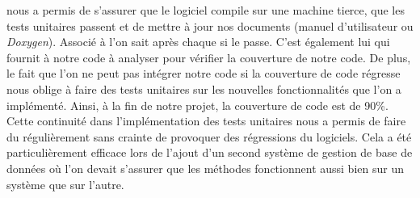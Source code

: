 \Travis{} nous a permis de s'assurer que le logiciel compile sur une machine tierce, que les tests unitaires passent et de mettre à jour nos documents (manuel d'utilisateur ou \textit{Doxygen}). Associé à \Github{} l'on sait après chaque \Commit{} si le \Build{} passe. C'est également lui qui fournit à \Coveralls{} notre code à analyser pour vérifier la couverture de notre code. De plus, le fait que l'on ne peut pas intégrer notre code si la couverture de code régresse nous oblige à faire des tests unitaires sur les nouvelles fonctionnalités que l'on a implémenté. Ainsi, à la fin de notre projet, la couverture de code est de 90\%. Cette continuité dans l'implémentation des tests unitaires nous a permis de faire du \Refactoring{} régulièrement sans crainte de provoquer des régressions du logiciels. Cela a été particulièrement efficace lors de l'ajout d'un second système de gestion de base de données où l'on devait s'assurer que les méthodes fonctionnent aussi bien sur un système que sur l'autre.  


